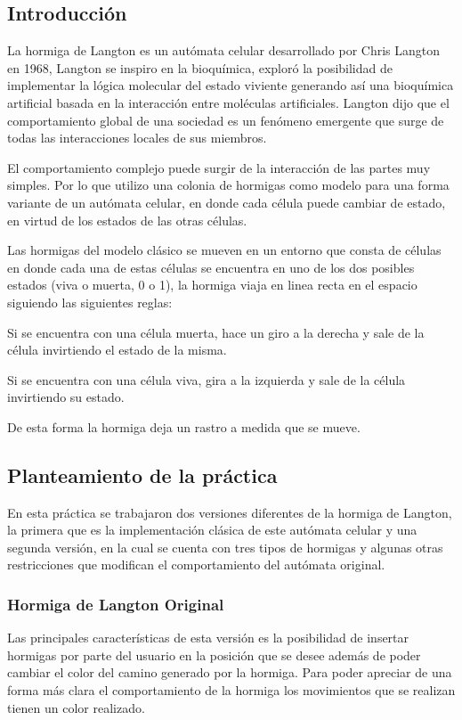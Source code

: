 \subsection{Introducción}
	La hormiga de Langton es un autómata celular desarrollado por Chris Langton en 1968, Langton se inspiro en la bioquímica, exploró la posibilidad de implementar la lógica molecular del estado viviente generando así una bioquímica artificial basada en la interacción entre moléculas artificiales. Langton dijo que el comportamiento global de una sociedad es un fenómeno emergente que surge de todas las interacciones locales de sus miembros. 

	El comportamiento complejo puede surgir de la interacción de las partes muy simples. Por lo que utilizo una colonia de hormigas como modelo para una forma variante de un autómata celular, en donde cada célula puede cambiar de estado, en virtud de los estados de las otras células. \cite{LANGTON}

	Las hormigas del modelo clásico se mueven en un entorno que consta de células en donde cada una de estas células se encuentra en uno de los dos posibles estados (viva o muerta, 0 o 1), la hormiga viaja en linea recta en el espacio siguiendo las siguientes reglas:
	\begin{description}
	 \item Si se encuentra con una célula muerta, hace un giro a la derecha y sale de la célula invirtiendo el estado de la misma.
	 \item Si se encuentra con una célula viva, gira a la izquierda y sale de la célula invirtiendo su estado.
	\end{description}

	De esta forma la hormiga deja un rastro a medida que se mueve.

\subsection{Planteamiento de la práctica}
	En esta práctica se trabajaron dos versiones diferentes de la hormiga de Langton, la primera que es la implementación clásica de este autómata celular y una segunda versión, en la cual se cuenta con tres tipos de hormigas y algunas otras restricciones que modifican el comportamiento del autómata original. 
	
	\subsubsection{Hormiga de Langton Original}
		Las principales características de esta versión es la posibilidad de insertar hormigas por parte del usuario en la posición que se desee además de poder cambiar el color del camino generado por la hormiga. Para poder apreciar de una forma más clara el comportamiento de la hormiga los movimientos que se realizan tienen un color realizado.

